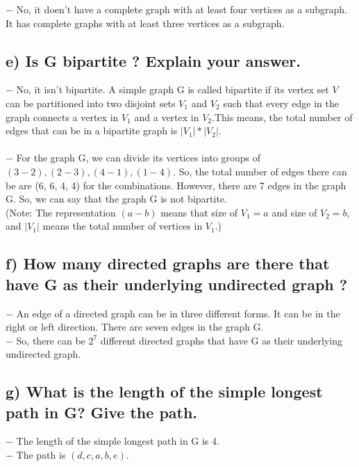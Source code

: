 \documentclass[12pt]{article}
\begin{document}
	$-$ No, it doen't have a complete graph with at least four vertices as a subgraph. It has complete graphs with at least three vertices as a subgraph.\\

\subsection*{e) Is G bipartite ? Explain your answer.} 

	$-$ No, it isn't bipartite. A simple graph G is called bipartite if its vertex set $V$ can be partitioned into two disjoint sets $V_1$ and $V_2$ such that every edge in the graph connects a vertex in $V_1$ and a vertex in $V_2$.This means, the total number of edges that can be in a bipartite graph is $|V_1|*|V_2|$.\\
\\
	$-$ For the graph G, we can divide its vertices into groups of $(3-2), (2-3), (4-1), (1-4)$. So, the total number of edges there can be are (6, 6, 4, 4) for the combinations. However, there are 7 edges in the graph G. So, we can say that the graph G is not bipartite.\\
(Note: The representation $(a-b)$ means that size of $V_1 = a$ and size of $V_2= b$, and $|V_1|$ means the total number of vertices in $V_1$.)\\

\subsection*{f) How many directed graphs are there that have G as their underlying undirected graph ?}

	$-$ An edge of a directed graph can be in three different forms. It can be in the right or left direction. There are seven edges in the graph G.\\
	$-$ So, there can be $2^7$ different directed graphs that have G as their underlying undirected graph.\\

\subsection*{g) What is the length of the simple longest path in G? Give the path.}

	$-$ The length of the simple longest path in G is 4.\\
	$-$ The path is $(d,c,a,b,e)$. \\
\end{document}
